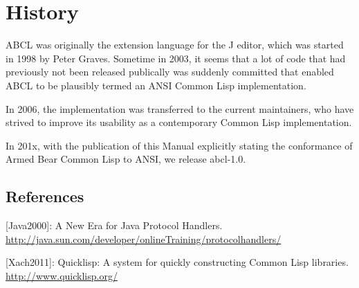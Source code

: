 \documentclass[10pt]{book}
\begin{document}
\chapter{History}

ABCL was originally the extension language for the J editor, which was
started in 1998 by Peter Graves.  Sometime in 2003, it seems that a
lot of code that had previously not been released publically was
suddenly committed that enabled ABCL to be plausibly termed an ANSI
Common Lisp implementation.  

In 2006, the implementation was transferred to the current
maintainers, who have strived to improve its usability as a
contemporary Common Lisp implementation.

In 201x, with the publication of this Manual explicitly stating the
conformance of Armed Bear Common Lisp to ANSI, we release abcl-1.0.




\section{References}

[Java2000]:  A New Era for Java Protocol Handlers.
\url{http://java.sun.com/developer/onlineTraining/protocolhandlers/}

[Xach2011]:  Quicklisp:  A system for quickly constructing Common Lisp
libraries.  \url{http://www.quicklisp.org/}
\end{document}
